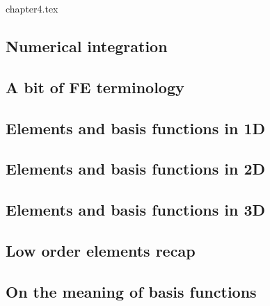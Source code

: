 \begin{flushright} {\tiny {\color{gray} chapter4.tex}} \end{flushright}

\subsection{Numerical integration} \label{sec:quadrature} %
\newpage
\subsection{A bit of FE terminology}  %
\newpage
\subsection{Elements and basis functions in 1D}\label{sec:elts1D}  %
\newpage
\subsection{Elements and basis functions in 2D}\label{sec:shpfct2d}  %
\newpage
\subsection{Elements and basis functions in 3D}  %
\newpage
\subsection{Low order elements recap}  %
\newpage
\subsection{On the meaning of basis functions}  %
